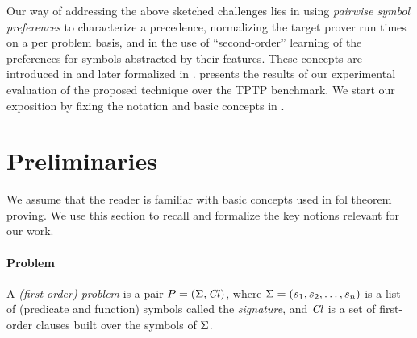 \documentclass{ceurart}
\begin{document}
Our way of addressing the above sketched challenges lies in using \emph{pairwise symbol preferences}
to characterize a precedence, normalizing the target prover run times on a per problem basis,
and in the use of ``second-order'' learning of the preferences for symbols abstracted by their features.
These concepts are introduced in  and later formalized in .
 presents the results of our experimental evaluation of the proposed technique over the TPTP \cite{Sut17} benchmark.
We start our exposition by fixing the notation and basic concepts in .


\section{Preliminaries} \label{sect:prelim}


We assume that the reader is familiar with basic concepts used in \gls*{fol} theorem proving.
We use this section to recall and formalize the key notions relevant for our work.



\paragraph{Problem}
A \emph{(first-order) problem} is a pair \(P = (\operatorname{\Sigma}, \operatorname{\mathit{Cl}})\),
where \(\operatorname{\Sigma} = (s_1, s_2, \ldots, s_n)\) is a list of (predicate and function) symbols called the \emph{signature},
and \(\operatorname{\mathit{Cl}}\) is a set of first-order
clauses built over the symbols of \(\operatorname{\Sigma}\).
\end{document}
